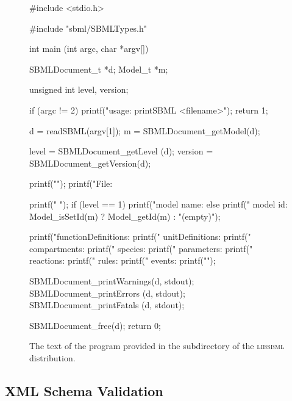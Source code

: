 \documentclass{sbmlmanual}
\newcommand{\libsbml}{\textsc{libsbml}}
\begin{document}
\begin{figure}
\begin{codeVerbatim}[C,flexiblecolumns=false]
#include <stdio.h>

#include "sbml/SBMLTypes.h"

int
main (int argc, char *argv[])
{
  SBMLDocument_t *d;
  Model_t        *m;

  unsigned int level, version;


  if (argc != 2)
  {
    printf("\n  usage: printSBML <filename>\n\n");
    return 1;
  }

  d = readSBML(argv[1]);
  m = SBMLDocument_getModel(d);

  level   = SBMLDocument_getLevel  (d);
  version = SBMLDocument_getVersion(d);

  printf("\n");
  printf("File: %

  printf("         ");
  if (level == 1)
  {
    printf("model name: %
  }
  else
  {
    printf("  model id: %
           Model_isSetId(m) ? Model_getId(m) : "(empty)");
  }

  printf("functionDefinitions: %
  printf("    unitDefinitions: %
  printf("       compartments: %
  printf("            species: %
  printf("         parameters: %
  printf("          reactions: %
  printf("              rules: %
  printf("             events: %
  printf("\n");

  SBMLDocument_printWarnings(d, stdout);
  SBMLDocument_printErrors  (d, stdout);
  SBMLDocument_printFatals  (d, stdout);

  SBMLDocument_free(d);
  return 0;
}
\end{codeVerbatim}
\caption{The text of the program  provided in the
   subdirectory of the \libsbml{} distribution.}
\label{fig:printsbml}
\end{figure}
                                        

\subsection{XML Schema Validation}
\label{sec:schema-validation}
\end{document}
